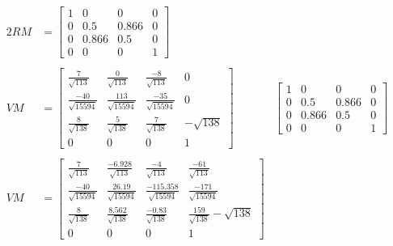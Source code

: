 \documentclass[12pt,fleqn,reqno]{article}
\begin{document}
\begin{alignat*}{2}
	RM &= \begin{bmatrix}
		1 & 0 & 0 & 0\\
		0 & 0.5 & 0.866 & 0\\
		0 & 0.866 & 0.5 & 0\\
		0 & 0 & 0 & 1
	\end{bmatrix}\\
	\\
	VM &=\begin{bmatrix}
		\frac{7}{\sqrt{113}} & \frac{0}{\sqrt{113}} & \frac{-8}{\sqrt{113}} & 0 \\
		\frac{-40}{\sqrt{15594}} & \frac{113}{\sqrt{15594}} & \frac{-35}{\sqrt{15594}} & 0 \\
		\frac{8}{\sqrt{138}} & \frac{5}{\sqrt{138}} & \frac{7}{\sqrt{138}} & -\sqrt{138} \\
		0 & 0 & 0 & 1
	\end{bmatrix}
	 &\begin{bmatrix}
		1 & 0 & 0 & 0\\
		0 & 0.5 & 0.866 & 0\\
		0 & 0.866 & 0.5 & 0\\
		0 & 0 & 0 & 1
	\end{bmatrix}\\
	\\
	VM &=\begin{bmatrix}
		\frac{7}{\sqrt{113}} & \frac{-6.928}{\sqrt{113}} & \frac{-4}{\sqrt{113}} &   \frac{-61}{\sqrt{113}} \\
		\frac{-40}{\sqrt{15594}} & \frac{26.19}{\sqrt{15594}} & \frac{-115.358}{\sqrt{15594}} & \frac{-171}{\sqrt{15594}} \\
		\frac{8}{\sqrt{138}} & \frac{8.562}{\sqrt{138}} & \frac{-0.83}{\sqrt{138}} &  \frac{159}{\sqrt{138}} -\sqrt{138} \\
		0 & 0 & 0 & 1
	\end{bmatrix}
\end{alignat*}
\end{document}
